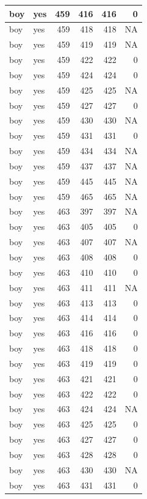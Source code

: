 \documentclass[man]{apa6}
\begin{document}
\begin{tabular}{l|l|r|r|r|r}
\hline
boy & yes & 459 & 416 & 416 & 0\\
\hline
boy & yes & 459 & 418 & 418 & NA\\
\hline
boy & yes & 459 & 419 & 419 & NA\\
\hline
boy & yes & 459 & 422 & 422 & 0\\
\hline
boy & yes & 459 & 424 & 424 & 0\\
\hline
boy & yes & 459 & 425 & 425 & NA\\
\hline
boy & yes & 459 & 427 & 427 & 0\\
\hline
boy & yes & 459 & 430 & 430 & NA\\
\hline
boy & yes & 459 & 431 & 431 & 0\\
\hline
boy & yes & 459 & 434 & 434 & NA\\
\hline
boy & yes & 459 & 437 & 437 & NA\\
\hline
boy & yes & 459 & 445 & 445 & NA\\
\hline
boy & yes & 459 & 465 & 465 & NA\\
\hline
boy & yes & 463 & 397 & 397 & NA\\
\hline
boy & yes & 463 & 405 & 405 & 0\\
\hline
boy & yes & 463 & 407 & 407 & NA\\
\hline
boy & yes & 463 & 408 & 408 & 0\\
\hline
boy & yes & 463 & 410 & 410 & 0\\
\hline
boy & yes & 463 & 411 & 411 & NA\\
\hline
boy & yes & 463 & 413 & 413 & 0\\
\hline
boy & yes & 463 & 414 & 414 & 0\\
\hline
boy & yes & 463 & 416 & 416 & 0\\
\hline
boy & yes & 463 & 418 & 418 & 0\\
\hline
boy & yes & 463 & 419 & 419 & 0\\
\hline
boy & yes & 463 & 421 & 421 & 0\\
\hline
boy & yes & 463 & 422 & 422 & 0\\
\hline
boy & yes & 463 & 424 & 424 & NA\\
\hline
boy & yes & 463 & 425 & 425 & 0\\
\hline
boy & yes & 463 & 427 & 427 & 0\\
\hline
boy & yes & 463 & 428 & 428 & 0\\
\hline
boy & yes & 463 & 430 & 430 & NA\\
\hline
boy & yes & 463 & 431 & 431 & 0\\

\end{tabular}
\end{document}
